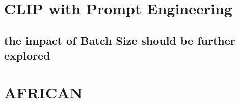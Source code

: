 \section{CLIP with Prompt Engineering}
\subsection{the impact of Batch Size should be further explored}


\section{AFRICAN}
